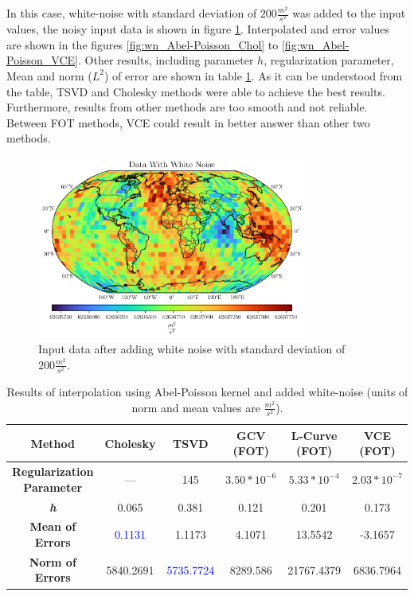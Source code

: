 \documentclass[12pt]{article}
\begin{document}
	In this case, white-noise with standard deviation of $200 \frac{m^2}{s^2}$ was added to the input values, the noisy input data is shown in figure \ref{fig:DataWithNoise}. Interpolated and error values are shown in the figures \ref{fig:wn_Abel-Poisson_Chol} to \ref{fig:wn_Abel-Poisson_VCE}. Other results, including parameter $h$, regularization parameter, Mean and norm ($L^2$) of error are shown in table \ref{tab:wn_Abel-Poisson_Results}. As it can be understood from the table, TSVD and Cholesky methods were able to achieve the best results. Furthermore, results from other methods are too smooth and not reliable. 
	Between FOT methods, VCE could result in better answer than other two methods.
	
	\begin{figure}[h!]
		\centering
		\includegraphics[height=6cm]{../Outputs/Plots/DataWithNoise.pdf}
		\caption{Input data after adding white noise with standard deviation of $200 \frac{m^2}{s^2}$.}
		\label{fig:DataWithNoise}
	\end{figure}
	
	\begin{table}[h!]
		\centering
		\caption{Results of interpolation using Abel-Poisson kernel and added white-noise (units of norm and mean values are $\frac{m^2}{s^2}$).}
		\vspace{0.2cm}
		\renewcommand{\arraystretch}{2}
		\begin{tabular}{c|c|c|c|c|c}
			\textbf{Method} & Cholesky & TSVD & GCV (FOT) & L-Curve (FOT) & VCE (FOT) \\
			\hline 
			\makecell{\textbf{Regularization} \\ \textbf{Parameter}} & --- & 145 & $3.50*10^{-6}$ & $5.33*10^{-4}$ & $2.03*10^{-7}$ \\
			\hline 
			\textit{\textbf{h}} & 0.065 & 0.381 & 0.121 & 0.201 & 0.173 \\
			\hline
			\textbf{Mean of Errors} & \textcolor{blue}{0.1131} & 1.1173 & 4.1071 & 13.5542 & -3.1657 \\
			\hline 
			\textbf{Norm of Errors} & 5840.2691 & \textcolor{blue}{5735.7724} & 8289.586 & 21767.4379 & 6836.7964 \\
		\end{tabular}
		\label{tab:wn_Abel-Poisson_Results}
	\end{table}
	
\end{document}
